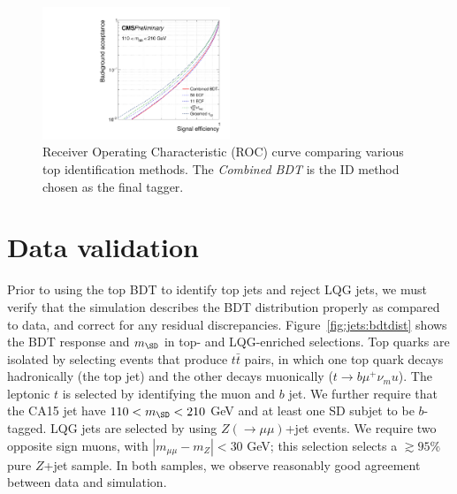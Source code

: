 \begin{figure}[]
    \begin{center}
        \includegraphics[width=0.5\textwidth]{figures/toptagging/bdt/massCut_roc.pdf}
        \caption{Receiver Operating Characteristic (ROC) curve comparing various top identification methods. The \emph{Combined BDT} is the ID method chosen as the final tagger.}
        \label{figs:jets:roc}
    \end{center}
\end{figure}

\section{Data validation}
\label{sec:jets:sf}

Prior to using the top BDT to identify top jets and reject LQG jets, we must verify that the simulation describes the BDT distribution properly as compared to data, and correct for any residual discrepancies.
Figure~\ref{fig:jets:bdtdist} shows the BDT response and $m_\SD$ in top- and LQG-enriched selections.
Top quarks are isolated by selecting events that produce $t\bar{t}$ pairs, in which one top quark decays hadronically (the top jet) and the other decays muonically ($t\rightarrow b\mu^+\nu_mu$).
The leptonic $t$ is selected by identifying the muon and $b$ jet. 
We further require that the CA15 jet have $110<m_\SD<210$ GeV and at least one SD subjet to be $b$-tagged.
LQG jets are selected by using $Z(\rightarrow\mu\mu)$+jet events.
We require two opposite sign muons, with $|m_{\mu\mu}-m_Z|<30$ GeV; this selection selects a $\gtrsim95\%$ pure $Z$+jet sample. 
In both samples, we observe reasonably good agreement between data and simulation.

